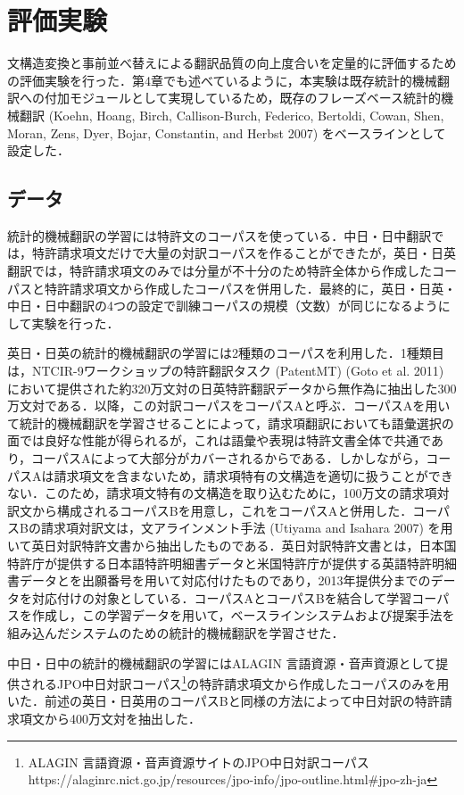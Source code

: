 \documentclass[japanese]{jnlp_1.4}
\begin{document}
\section{評価実験}

文構造変換と事前並べ替えによる翻訳品質の向上度合いを定量的に評価するための評価実験を行った．第4章でも述べているように，本実験は既存統計的機械翻訳への付加モジュールとして実現しているため，既存のフレーズベース統計的機械翻訳 (Koehn, 
Hoang, Birch, Callison-Burch, Federico, Bertoldi, Cowan, Shen, Moran, Zens, 
Dyer, Bojar, Constantin, and Herbst 2007) をベースラインとして設定した．


\subsection{データ}

統計的機械翻訳の学習には特許文のコーパスを使っている．中日・日中翻訳では，特許請求項文だけで大量の対訳コーパスを作ることができたが，英日・日英翻訳では，特許請求項文のみでは分量が不十分のため特許全体から作成したコーパスと特許請求項文から作成したコーパスを併用した．最終的に，英日・日英・中日・日中翻訳の4つの設定で訓練コーパスの規模（文数）が同じになるようにして実験を行った．

英日・日英の統計的機械翻訳の学習には2種類のコーパスを利用した．1種類目は，NTCIR-9ワークショップの特許翻訳タスク (PatentMT) (Goto 
et al. 
2011) において提供された約320万文対の日英特許翻訳データから無作為に抽出した300万文対である．以降，この対訳コーパスをコーパスAと呼ぶ．コーパスAを用いて統計的機械翻訳を学習させることによって，請求項翻訳においても語彙選択の面では良好な性能が得られるが，これは語彙や表現は特許文書全体で共通であり，コーパスAによって大部分がカバーされるからである．しかしながら，コーパスAは請求項文を含まないため，請求項特有の文構造を適切に扱うことができない．このため，請求項文特有の文構造を取り込むために，100万文の請求項対訳文から構成されるコーパスBを用意し，これをコーパスAと併用した．コーパスBの請求項対訳文は，文アラインメント手法 (Utiyama 
and Isahara 
2007) を用いて英日対訳特許文書から抽出したものである．英日対訳特許文書とは，日本国特許庁が提供する日本語特許明細書データと米国特許庁が提供する英語特許明細書データとを出願番号を用いて対応付けたものであり，2013年提供分までのデータを対応付けの対象としている．コーパスAとコーパスBを結合して学習コーパスを作成し，この学習データを用いて，ベースラインシステムおよび提案手法を組み込んだシステムのための統計的機械翻訳を学習させた．

中日・日中の統計的機械翻訳の学習にはALAGIN 
言語資源・音声資源として提供されるJPO中日対訳コーパス\footnote{ALAGIN 言語資源・音声資源サイトのJPO中日対訳コーパス https://alaginrc.nict.go.jp/resources/jpo-info/\linebreak[2]jpo-outline.html{\#}jpo-zh-ja}の特許請求項文から作成したコーパスのみを用いた．前述の英日・日英用のコーパスBと同様の方法によって中日対訳の特許請求項文から400万文対を抽出した．
\end{document}
